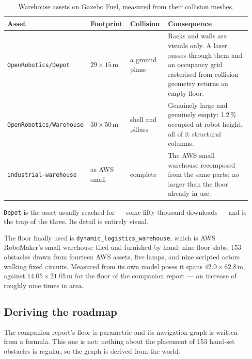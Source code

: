 \documentclass[11pt,a4paper]{article}
\theoremstyle{definition}
\newcommand{\code}[1]{\texttt{\small #1}}
\begin{document}
\begin{table}[H]
\centering\small
\caption{Warehouse assets on Gazebo Fuel, measured from their collision meshes.}
\label{tab:fuel}
\begin{tabularx}{\textwidth}{@{}lllX@{}}
\toprule
\textbf{Asset} & \textbf{Footprint} & \textbf{Collision} & \textbf{Consequence} \\
\midrule
\code{OpenRobotics/Depot} & $29 \times 15$\,m & a ground plane &
Racks and walls are visuals only. A laser passes through them and an occupancy
grid rasterised from collision geometry returns an empty floor. \\
\addlinespace
\code{OpenRobotics/Warehouse} & $30 \times 50$\,m & shell and pillars &
Genuinely large and genuinely empty: 1.2\,\% occupied at robot height, all of
it structural columns. \\
\addlinespace
\code{industrial-warehouse} & as AWS small & complete &
The AWS small warehouse recomposed from the same parts; no larger than the
floor already in use. \\
\bottomrule
\end{tabularx}
\end{table}

\code{Depot} is the asset usually reached for --- some fifty thousand
downloads --- and is the trap of the three. Its detail is entirely visual.

The floor finally used is \code{dynamic\_logistics\_warehouse}, which is AWS
RoboMaker's small warehouse tiled and furnished by hand: nine floor slabs,
153 obstacles drawn from fourteen AWS assets, five lamps, and nine scripted
actors walking fixed circuits. Measured from its own model poses it spans
$42.0 \times 62.8$\,m, against $14.05 \times 21.05$\,m for the floor of the
companion report --- an increase of roughly nine times in area.

\subsection{Deriving the roadmap}

The companion report's floor is parametric and its navigation graph is written
from a formula. This one is not: nothing about the placement of 153 hand-set
obstacles is regular, so the graph is derived from the world.
\end{document}
